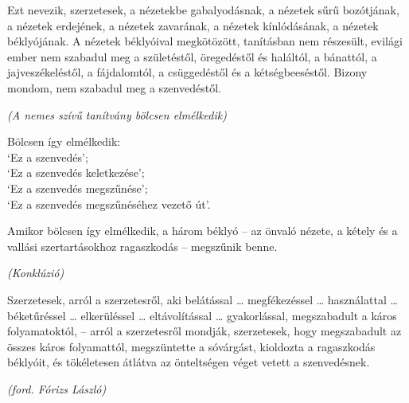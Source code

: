 {Ezt nevezik, szerzetesek, a nézetekbe gabalyodásnak, a nézetek sűrű bozótjának, a nézetek erdejének, a nézetek zavarának, a nézetek kínlódásának, a nézetek béklyójának. A nézetek béklyóival megkötözött, tanításban nem részesült, evilági ember nem szabadul meg a születéstől, öregedéstől és haláltól, a bánattól, a jajveszékeléstől, a fájdalomtól, a csüggedéstől és a kétségbeeséstől. Bizony mondom, nem szabadul meg a szenvedéstől.

\emph{(A nemes szívű tanítvány bölcsen elmélkedik)}

Bölcsen így elmélkedik:\\
`Ez a szenvedés';\\
`Ez a szenvedés keletkezése';\\
`Ez a szenvedés megszűnése';\\
`Ez a szenvedés megszűnéséhez vezető út'.

Amikor bölcsen így elmélkedik, a három béklyó -- az önvaló nézete, a kétely és a
vallási szertartásokhoz ragaszkodás -- megszűnik benne.

\clearpage

\emph{(Konklúzió)}

Szerzetesek, arról a szerzetesről, aki belátással \ldots{} megfékezéssel
\ldots{} használattal \ldots{} béketűréssel \ldots{} elkerüléssel \ldots{}
eltávolítással \ldots{} gyakorlással, megszabadult a káros folyamatoktól, --
arról a szerzetesről mondják, szerzetesek, hogy megszabadult az összes káros
folyamattól, megszüntette a sóvárgást, kioldozta a ragaszkodás béklyóit, és
tökéletesen átlátva az önteltségen véget vetett a szenvedésnek.

\bigskip

{\raggedleft
\emph{(ford. Fórizs László)}
\par}

}
